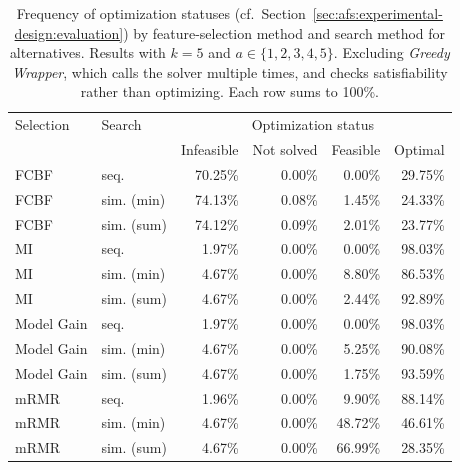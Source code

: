 \documentclass{article}
\theoremstyle{definition}
\begin{document}
\begin{table}[htb]
	\centering
	\begin{tabular}{llrrrr}
		\toprule
		Selection & Search & \multicolumn{4}{c}{Optimization status} \\
		\cmidrule(r){3-6}
		& & Infeasible & Not solved & Feasible & Optimal \\
		\midrule
		FCBF & seq. & 70.25\% & 0.00\% & 0.00\% & 29.75\% \\
		FCBF & sim. (min) & 74.13\% & 0.08\% & 1.45\% & 24.33\% \\
		FCBF & sim. (sum) & 74.12\% & 0.09\% & 2.01\% & 23.77\% \\
		MI & seq. & 1.97\% & 0.00\% & 0.00\% & 98.03\% \\
		MI & sim. (min) & 4.67\% & 0.00\% & 8.80\% & 86.53\% \\
		MI & sim. (sum) & 4.67\% & 0.00\% & 2.44\% & 92.89\% \\
		Model Gain & seq. & 1.97\% & 0.00\% & 0.00\% & 98.03\% \\
		Model Gain & sim. (min) & 4.67\% & 0.00\% & 5.25\% & 90.08\% \\
		Model Gain & sim. (sum) & 4.67\% & 0.00\% & 1.75\% & 93.59\% \\
		mRMR & seq. & 1.96\% & 0.00\% & 9.90\% & 88.14\% \\
		mRMR & sim. (min) & 4.67\% & 0.00\% & 48.72\% & 46.61\% \\
		mRMR & sim. (sum) & 4.67\% & 0.00\% & 66.99\% & 28.35\% \\
		\bottomrule
	\end{tabular}
	\caption{
		Frequency of optimization statuses (cf.~Section~\ref{sec:afs:experimental-design:evaluation}) by feature-selection method and search method for alternatives.
		Results with $k=5$ and $a \in \{1,2,3,4,5\}$.
		Excluding \emph{Greedy Wrapper}, which calls the solver multiple times, and checks satisfiability rather than optimizing.
		Each row sums to 100\%.
	}
	\label{tab:afs:impact-search-fs-method-optimization-status}
\end{table}
%
\end{document}
